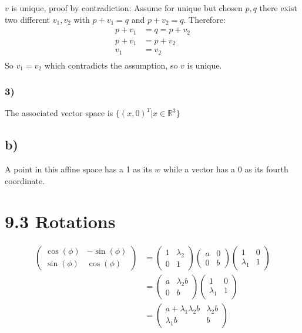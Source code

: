 \documentclass[a4paper]{scrartcl}
\begin{document}
$v$ is unique, proof by contradiction:
Assume for unique but chosen $p, q$ there exist two different $v_1, v_2$ with $p + v_1 = q$ and $p + v_2 = q$. 
Therefore:
\begin{align*}
  p + v_1 &= q = p + v_2 \\
  p + v_1 &= p + v_2 \\
  v_1 &= v_2 \\
\end{align*}
So $v_1 = v_2$ which contradicts the assumption, so $v$ is unique.

\subsubsection*{3)}
The associated vector space is $\{ (x, 0)^T | x \in \mathbb{R}^3 \}$

\subsection*{b)}
A point in this affine space has a 1 as its $w$ while a vector has a 0 as its fourth coordinate.

\section*{9.3 Rotations}
\begin{align*}
  \begin{pmatrix} \cos(\phi) & - \sin(\phi) \\ \sin(\phi) & \cos(\phi) \end{pmatrix} &= 
  \begin{pmatrix} 1 & \lambda_2 \\ 0 & 1 \end{pmatrix}
  \begin{pmatrix} a & 0 \\ 0 & b \end{pmatrix} 
  \begin{pmatrix} 1 & 0 \\ \lambda_1 & 1 \end{pmatrix} \\
    &= \begin{pmatrix} a & \lambda_2 b \\ 0 & b \end{pmatrix} \begin{pmatrix} 1 & 0 \\ \lambda_1 & 1 \end{pmatrix} \\
    &= \begin{pmatrix} a + \lambda_1 \lambda_2 b & \lambda_2 b \\ \lambda_1 b & b \end{pmatrix}
\end{align*}
\end{document}
